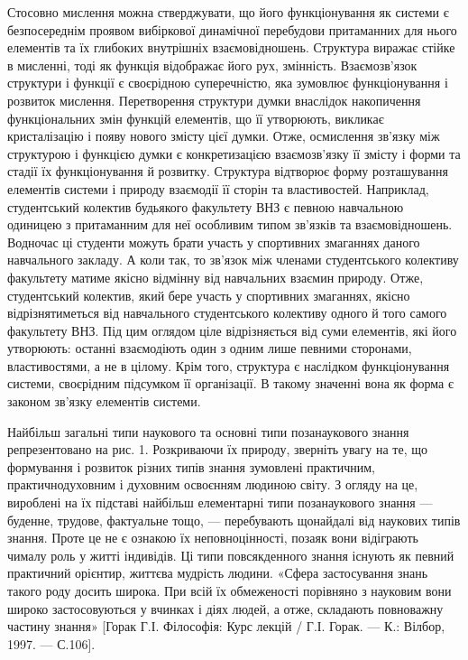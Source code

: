 Стосовно мислення можна стверджувати, що його функціонування як
системи є безпосереднім проявом вибіркової динамічної перебудови
притаманних для нього елементів та їх глибоких внутрішніх взаємовідношень.
Структура виражає стійке в мисленні, тоді як функція відображає його рух,
змінність. Взаємозв’язок структури і функції є своєрідною суперечністю, яка
зумовлює функціонування і розвиток мислення. Перетворення структури думки
внаслідок накопичення функціональних змін функцій елементів, що її
утворюють, викликає кристалізацію і появу нового змісту цієї думки. Отже,
осмислення зв’язку між структурою і функцією думки є конкретизацією
взаємозв’язку її змісту і форми та стадії їх функціонування й розвитку.
Структура відтворює форму розташування елементів системи і природу
взаємодії її сторін та властивостей. Наприклад, студентський колектив будьякого факультету ВНЗ є певною навчальною одиницею з притаманним для неї
особливим типом зв’язків та взаємовідношень. Водночас ці студенти можуть
брати участь у спортивних змаганнях даного навчального закладу. А коли так,
то зв’язок між членами студентського колективу факультету матиме якісно
відмінну від навчальних взаємин природу. Отже, студентський колектив, який
бере участь у спортивних змаганнях, якісно відрізнятиметься від навчального
студентського колективу одного й того самого факультету ВНЗ. Під цим
оглядом ціле відрізняється від суми елементів, які його утворюють: останні
взаємодіють один з одним лише певними сторонами, властивостями, а не в
цілому. Крім того, структура є наслідком функціонування системи, своєрідним
підсумком її організації. В такому значенні вона як форма є законом зв’язку
елементів системи.

Найбільш загальні типи наукового та основні типи позанаукового знання
репрезентовано на рис. 1. Розкриваючи їх природу, зверніть увагу на те, що
формування і розвиток різних типів знання зумовлені практичним, практичнодуховним і духовним освоєнням людиною світу. З огляду на це, вироблені на їх
підставі найбільш елементарні типи позанаукового знання --- буденне, трудове,
фактуальне тощо, --- перебувають щонайдалі від наукових типів знання. Проте
це не є ознакою їх неповноцінності, позаяк вони відіграють чималу роль у
житті індивідів. Ці типи повсякденного знання існують як певний практичний
орієнтир, життєва мудрість людини. «Сфера застосування знань такого роду
досить широка. При всій їх обмеженості порівняно з науковим вони широко
застосовуються у вчинках і діях людей, а отже, складають повноважну частину
знання» [Горак Г.І. Філософія: Курс лекцій / Г.І. Горак. --- К.: Вілбор, 1997. ---
С.106].

